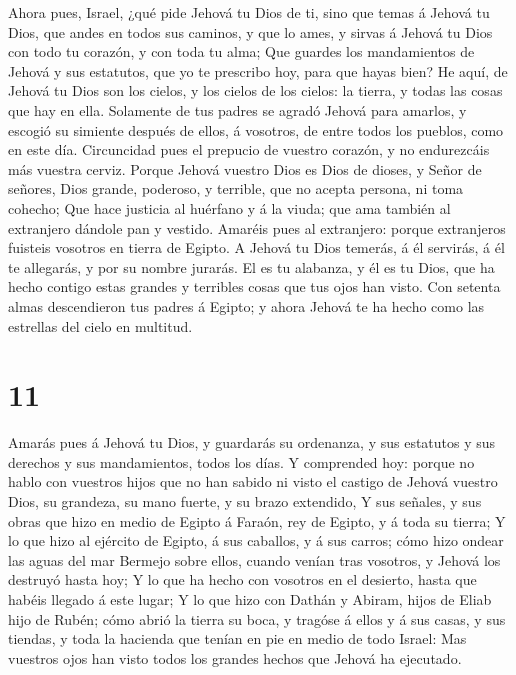  Ahora pues, Israel, ¿qué pide Jehová tu Dios de ti, sino
que temas á Jehová tu Dios, que andes en todos sus caminos, y que lo
ames, y sirvas á Jehová tu Dios con todo tu corazón, y con toda tu alma;
 Que guardes los mandamientos de Jehová y sus estatutos,
que yo te prescribo hoy, para que hayas bien?  He aquí, de
Jehová tu Dios son los cielos, y los cielos de los cielos: la tierra, y
todas las cosas que hay en ella.  Solamente de tus padres
se agradó Jehová para amarlos, y escogió su simiente después de ellos, á
vosotros, de entre todos los pueblos, como en este día. 
Circuncidad pues el prepucio de vuestro corazón, y no endurezcáis más
vuestra cerviz.  Porque Jehová vuestro Dios es Dios de
dioses, y Señor de señores, Dios grande, poderoso, y terrible, que no
acepta persona, ni toma cohecho;  Que hace justicia al
huérfano y á la viuda; que ama también al extranjero dándole pan y
vestido.  Amaréis pues al extranjero: porque extranjeros
fuisteis vosotros en tierra de Egipto.  A Jehová tu Dios
temerás, á él servirás, á él te allegarás, y por su nombre jurarás.
 El es tu alabanza, y él es tu Dios, que ha hecho contigo
estas grandes y terribles cosas que tus ojos han visto. 
Con setenta almas descendieron tus padres á Egipto; y ahora Jehová te ha
hecho como las estrellas del cielo en multitud.

\hypertarget{section-10}{%
\section{11}\label{section-10}}

 Amarás pues á Jehová tu Dios, y guardarás su ordenanza, y
sus estatutos y sus derechos y sus mandamientos, todos los días.
 Y comprended hoy: porque no hablo con vuestros hijos que no
han sabido ni visto el castigo de Jehová vuestro Dios, su grandeza, su
mano fuerte, y su brazo extendido,  Y sus señales, y sus
obras que hizo en medio de Egipto á Faraón, rey de Egipto, y á toda su
tierra;  Y lo que hizo al ejército de Egipto, á sus
caballos, y á sus carros; cómo hizo ondear las aguas del mar Bermejo
sobre ellos, cuando venían tras vosotros, y Jehová los destruyó hasta
hoy;  Y lo que ha hecho con vosotros en el desierto, hasta
que habéis llegado á este lugar;  Y lo que hizo con Dathán y
Abiram, hijos de Eliab hijo de Rubén; cómo abrió la tierra su boca, y
tragóse á ellos y á sus casas, y sus tiendas, y toda la hacienda que
tenían en pie en medio de todo Israel:  Mas vuestros ojos
han visto todos los grandes hechos que Jehová ha ejecutado.

